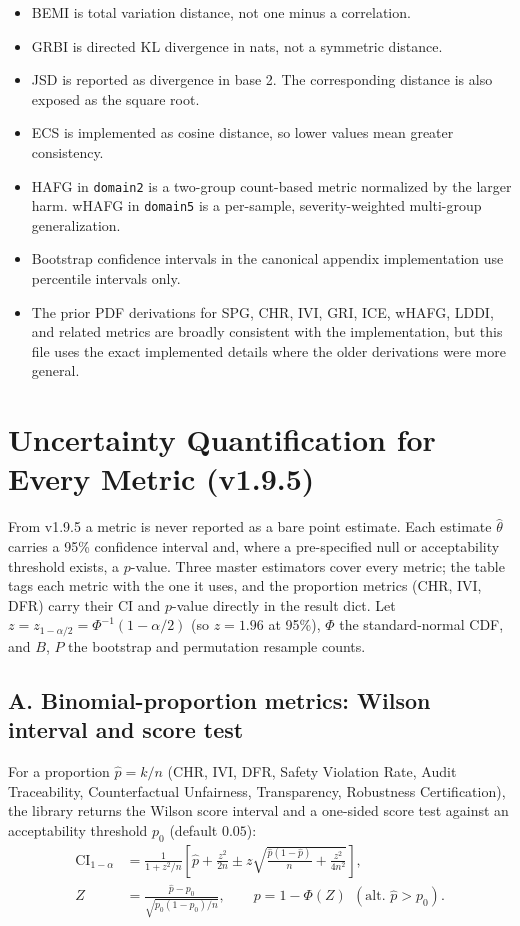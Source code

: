 \documentclass[11pt]{article}
\begin{document}
\begin{itemize}[leftmargin=*]
\item BEMI is total variation distance, not one minus a correlation.
\item GRBI is directed KL divergence in nats, not a symmetric distance.
\item JSD is reported as divergence in base 2. The corresponding distance is
also exposed as the square root.
\item ECS is implemented as cosine distance, so lower values mean greater
consistency.
\item HAFG in \texttt{domain2} is a two-group count-based metric normalized by
the larger harm. wHAFG in \texttt{domain5} is a per-sample,
severity-weighted multi-group generalization.
\item Bootstrap confidence intervals in the canonical appendix implementation
use percentile intervals only.
\item The prior PDF derivations for SPG, CHR, IVI, GRI, ICE, wHAFG, LDDI, and
related metrics are broadly consistent with the implementation, but this file
uses the exact implemented details where the older derivations were more
general.
\end{itemize}

\section{Uncertainty Quantification for Every Metric (v1.9.5)}

From v1.9.5 a metric is never reported as a bare point estimate. Each estimate
$\hat\theta$ carries a 95\% confidence interval and, where a pre-specified null
or acceptability threshold exists, a $p$-value. Three master estimators cover
every metric; the table tags each metric with the one it uses, and the
proportion metrics (CHR, IVI, DFR) carry their CI and $p$-value directly in the
result dict. Let $z=z_{1-\alpha/2}=\Phi^{-1}(1-\alpha/2)$ (so $z=1.96$ at 95\%),
$\Phi$ the standard-normal CDF, and $B$, $P$ the bootstrap and permutation
resample counts.

\subsection{A. Binomial-proportion metrics: Wilson interval and score test}

For a proportion $\hat p=k/n$ (CHR, IVI, DFR, Safety Violation Rate, Audit
Traceability, Counterfactual Unfairness, Transparency, Robustness
Certification), the library returns the Wilson score interval and a one-sided
score test against an acceptability threshold $p_0$ (default $0.05$):
\begin{align}
\mathrm{CI}_{1-\alpha} &= \frac{1}{1+z^2/n}
\left[\hat p+\frac{z^2}{2n}\pm z\sqrt{\frac{\hat p(1-\hat p)}{n}+\frac{z^2}{4n^2}}\right],\\
Z &= \frac{\hat p-p_0}{\sqrt{p_0(1-p_0)/n}},\qquad
p = 1-\Phi(Z)\ \ (\text{alt. } \hat p>p_0).
\end{align}
\end{document}
